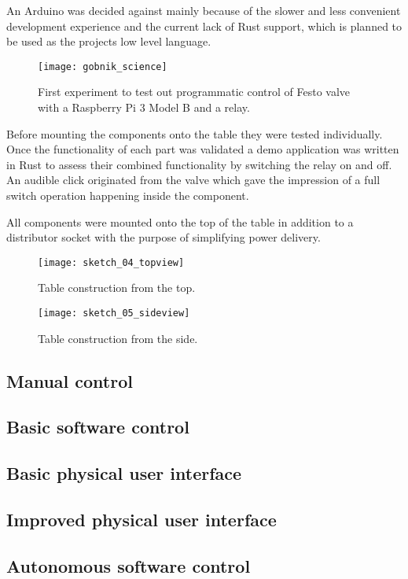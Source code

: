 An Arduino was decided against mainly because of the slower and less convenient development experience and the current lack of Rust \cite{rust} support, which is planned to be used as the projects low level language.

\begin{figure}[hp]
\centering

\texttt{[image: gobnik\_science]}

\caption{First experiment to test out programmatic control of Festo valve with a Raspberry Pi 3 Model B and a relay.}
\end{figure}

Before mounting the components onto the table they were tested individually. Once the functionality of each part was validated a demo application was written in Rust to assess their combined functionality by switching the relay on and off. An audible click originated from the valve which gave the impression of a full switch operation happening inside the component.

All components were mounted onto the top of the table in addition to a distributor socket with the purpose of simplifying power delivery.

\newpage

\begin{figure}[hp]
\centering

\texttt{[image: sketch\_04\_topview]}

\caption{Table construction from the top.}
\end{figure}

\begin{figure}[hp]
\centering

\texttt{[image: sketch\_05\_sideview]}

\caption{Table construction from the side.}
\end{figure}

\subsection{Manual control}

\subsection{Basic software control}


\subsection{Basic physical user interface}


\subsection{Improved physical user interface}


\subsection{Autonomous software control}